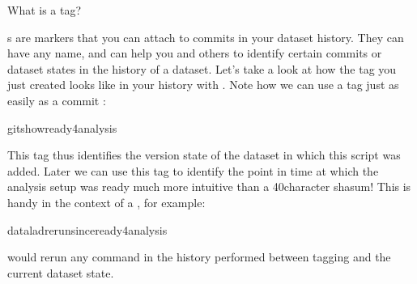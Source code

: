 \ignorespaces \begin{findoutmore}[label={index-6}, before title={\thetcbcounter\ }, check odd page=true]{What is a tag?}
\label{\detokenize{basics/101-130-yodaproject:index-6}}

\sphinxAtStartPar
{\hyperref[\detokenize{glossary:term-tag}]{}}s are markers that you can attach to commits in your dataset history.
They can have any name, and can help you and others to identify certain commits
or dataset states in the history of a dataset. Let’s take a look at how the tag
you just created looks like in your history with .
Note how we can use a tag just as easily as a commit {\hyperref[\detokenize{glossary:term-shasum}]{}}:

\begin{sphinxVerbatim}[commandchars=\\\{\}]
gitshowready4analysis


\end{sphinxVerbatim}

\sphinxAtStartPar
This tag thus identifies the version state of the dataset in which this script
was added.
Later we can use this tag to identify the point in time at which
the analysis setup was ready \textendash{} much more intuitive than a 40\sphinxhyphen{}character shasum!
This is handy in the context of a , for example:

\begin{sphinxVerbatim}[commandchars=\\\{\}]
dataladrerun\PYGZhy{}\PYGZhy{}sinceready4analysis
\end{sphinxVerbatim}

\sphinxAtStartPar
would rerun any  command in the history performed between tagging
and the current dataset state.


\end{findoutmore}

